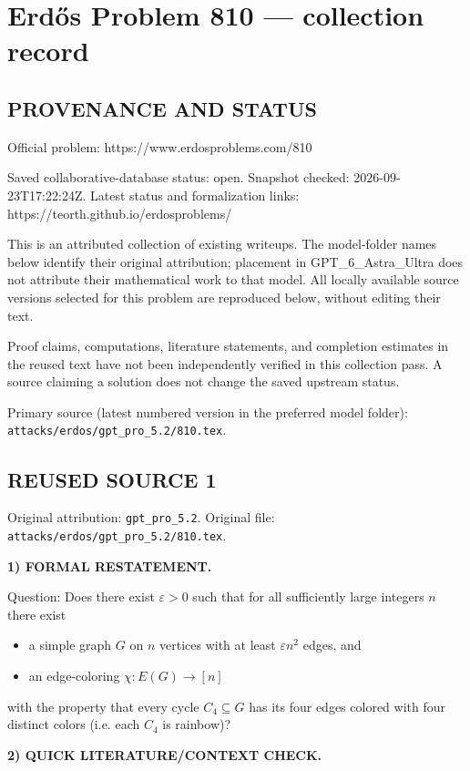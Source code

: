 \section*{Erd\H{o}s Problem 810 --- collection record}

\subsection*{PROVENANCE AND STATUS}
Official problem: https://www.erdosproblems.com/810

Saved collaborative-database status: open.
Snapshot checked: 2026-09-23T17:22:24Z.
Latest status and formalization links: https://teorth.github.io/erdosproblems/

This is an attributed collection of existing writeups. The model-folder names below identify their original attribution; placement in GPT\_6\_Astra\_Ultra does not attribute their mathematical work to that model. All locally available source versions selected for this problem are reproduced below, without editing their text.

Proof claims, computations, literature statements, and completion estimates in the reused text have not been independently verified in this collection pass. A source claiming a solution does not change the saved upstream status.

Primary source (latest numbered version in the preferred model folder): \texttt{attacks/erdos/gpt\_pro\_5.2/810.tex}.

\subsection*{REUSED SOURCE 1}
Original attribution: \texttt{gpt\_pro\_5.2}.
Original file: \texttt{attacks/erdos/gpt\_pro\_5.2/810.tex}.


\noindent\textbf{1) FORMAL RESTATEMENT.}

Question: Does there exist $\varepsilon>0$ such that for all sufficiently large integers $n$ there exist
\begin{itemize}
\item a simple graph $G$ on $n$ vertices with at least $\varepsilon n^2$ edges, and
\item an edge-coloring $\chi:E(G)\to [n]$
\end{itemize}
with the property that every cycle $C_4\subseteq G$ has its four edges colored with four distinct colors (i.e. each $C_4$ is rainbow)?

\medskip
\noindent\textbf{2) QUICK LITERATURE/CONTEXT CHECK.}

